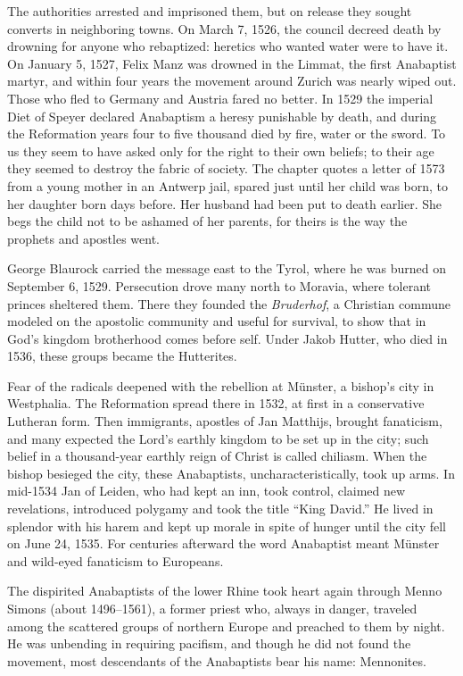 The authorities arrested and imprisoned them, but on release they sought converts in neighboring
towns. On March 7, 1526, the council decreed death by drowning for anyone who rebaptized: heretics who wanted water were to have it. On January 5, 1527, Felix Manz was drowned in the Limmat, the
first Anabaptist martyr, and within four years the movement around Zurich was nearly wiped out. Those
who fled to Germany and Austria fared no better. In 1529 the imperial Diet of Speyer declared
Anabaptism a heresy punishable by death, and during the Reformation years four to five thousand died by fire, water or the sword. To us they seem to have asked only for the right to their own
beliefs; to their age they seemed to destroy the fabric of society. The chapter quotes a letter of
1573 from a young mother in an Antwerp jail, spared just until her child was born, to her daughter born days before. Her husband had been put to death earlier. She begs the child not to be ashamed
of her parents, for theirs is the way the prophets and apostles went.

George Blaurock carried the message east to the Tyrol, where he was burned on September 6, 1529.
Persecution drove many north to Moravia, where tolerant princes sheltered them. There they founded
the \emph{Bruderhof}, a Christian commune modeled on the apostolic community and useful for survival,
to show that in God's kingdom brotherhood comes before self. Under Jakob Hutter, who died in 1536,
these groups became the Hutterites.

Fear of the radicals deepened with the rebellion at M\"unster, a bishop's city in Westphalia. The
Reformation spread there in 1532, at first in a conservative Lutheran form. Then immigrants, apostles
of Jan Matthijs, brought fanaticism, and many expected the Lord's earthly kingdom to be set up in the
city; such belief in a thousand-year earthly reign of Christ is called chiliasm. When the bishop
besieged the city, these Anabaptists, uncharacteristically, took up arms. In mid-1534 Jan of Leiden, who had kept an inn, took control, claimed new revelations, introduced polygamy and took
the title ``King David.'' He lived in splendor with his harem and kept up morale in spite of hunger
until the city fell on June 24, 1535. For centuries afterward the word Anabaptist meant M\"unster and
wild-eyed fanaticism to Europeans.

The dispirited Anabaptists of the lower Rhine took heart again through Menno Simons (about
1496--1561), a former priest who, always in danger, traveled among the scattered groups of northern
Europe and preached to them by night. He was unbending in requiring pacifism, and though he did not
found the movement, most descendants of the Anabaptists bear his name: Mennonites.

